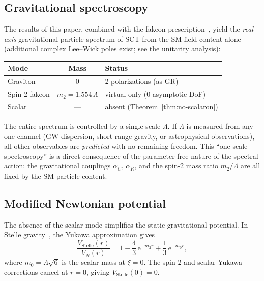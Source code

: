 \documentclass[12pt,a4paper]{article}
\newcommand{\Lam}{\Lambda}
\newcommand{\alphaR}{\alpha_R}
\newcommand{\alphaC}{\alpha_C}
\newcommand{\ee}{\mathrm{e}}
\begin{document}
\subsection{Gravitational spectroscopy}

The results of this paper, combined with the fakeon
prescription~\cite{Anselmi2017}, yield the \emph{real-axis}
gravitational particle spectrum of SCT from the SM field content alone
(additional complex Lee--Wick poles exist; see the unitarity analysis):
\begin{center}
\begin{tabular}{lcl}
\toprule
Mode & Mass & Status \\
\midrule
Graviton & $0$ & 2 polarizations (as GR) \\
Spin-2 fakeon & $m_2 = 1.554\,\Lam$ & virtual only (0 asymptotic DoF) \\
Scalar & --- & absent (Theorem~\ref{thm:no-scalaron}) \\
\bottomrule
\end{tabular}
\end{center}
The entire spectrum is controlled by a single scale $\Lam$. If $\Lam$
is measured from any one channel (GW dispersion, short-range gravity,
or astrophysical observations), all other observables are
\emph{predicted} with no remaining freedom. This ``one-scale
spectroscopy'' is a direct consequence of the parameter-free nature
of the spectral action: the gravitational couplings $\alphaC$,
$\alphaR$, and the spin-2 mass ratio $m_2/\Lam$ are all fixed by
the SM particle content.


\subsection{Modified Newtonian potential}

The absence of the scalar mode simplifies the static gravitational
potential. In Stelle gravity~\cite{Stelle1977}, the Yukawa approximation
gives~\cite{Alfyorov2025b}
\begin{equation}\label{eq:V-stelle}
  \frac{V_{\mathrm{Stelle}}(r)}{V_N(r)}
  = 1 - \frac{4}{3}\,\ee^{-m_2 r} + \frac{1}{3}\,\ee^{-m_0 r},
\end{equation}
where $m_0 = \Lam\sqrt{6}$ is the scalar mass at $\xi = 0$.
The spin-2 and scalar Yukawa corrections cancel at $r = 0$, giving
$V_{\mathrm{Stelle}}(0) = 0$.
\end{document}
